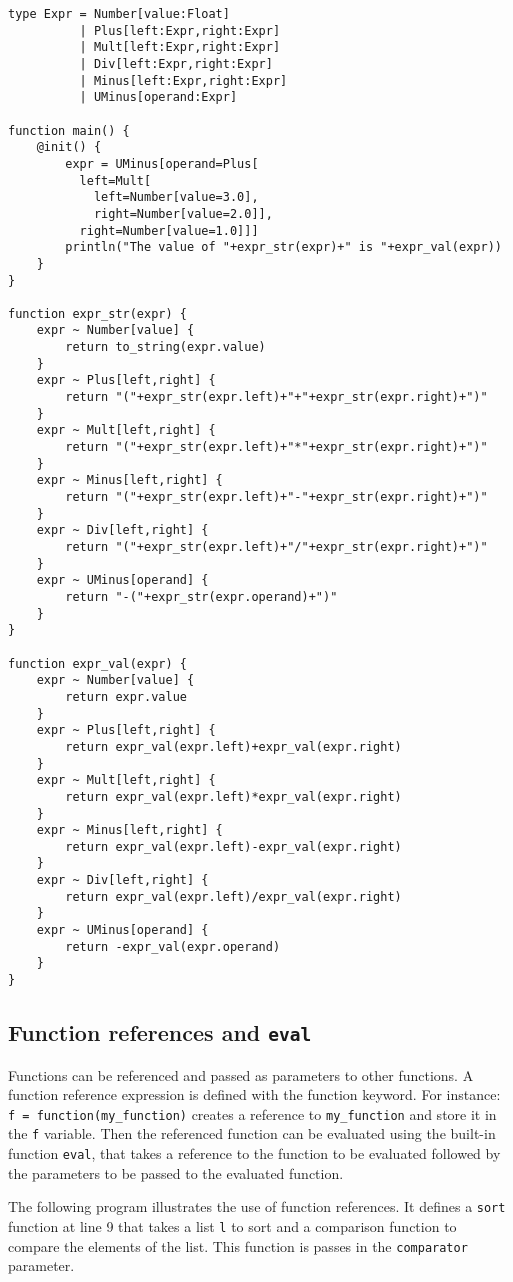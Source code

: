 \documentclass[11pt]{article}
\begin{document}
{ \footnotesize
\begin{lstlisting}
type Expr = Number[value:Float]
          | Plus[left:Expr,right:Expr]
          | Mult[left:Expr,right:Expr]
          | Div[left:Expr,right:Expr]
          | Minus[left:Expr,right:Expr]
          | UMinus[operand:Expr]

function main() {
	@init() {
		expr = UMinus[operand=Plus[
		  left=Mult[
		    left=Number[value=3.0],
		    right=Number[value=2.0]],
	      right=Number[value=1.0]]]
		println("The value of "+expr_str(expr)+" is "+expr_val(expr))
	}
}

function expr_str(expr) {
	expr ~ Number[value] {
		return to_string(expr.value)
	}
	expr ~ Plus[left,right] {
		return "("+expr_str(expr.left)+"+"+expr_str(expr.right)+")"
	}
	expr ~ Mult[left,right] {
		return "("+expr_str(expr.left)+"*"+expr_str(expr.right)+")"
	}
	expr ~ Minus[left,right] {
		return "("+expr_str(expr.left)+"-"+expr_str(expr.right)+")"
	}
	expr ~ Div[left,right] {
		return "("+expr_str(expr.left)+"/"+expr_str(expr.right)+")"
	}
	expr ~ UMinus[operand] {
		return "-("+expr_str(expr.operand)+")"
	}
}

function expr_val(expr) {
	expr ~ Number[value] {
		return expr.value
	}
	expr ~ Plus[left,right] {
		return expr_val(expr.left)+expr_val(expr.right)
	}
	expr ~ Mult[left,right] {
		return expr_val(expr.left)*expr_val(expr.right)
	}
	expr ~ Minus[left,right] {
		return expr_val(expr.left)-expr_val(expr.right)
	}
	expr ~ Div[left,right] {
		return expr_val(expr.left)/expr_val(expr.right)
	}
	expr ~ UMinus[operand] {
		return -expr_val(expr.operand)
	}
}
\end{lstlisting} }

\subsection{Function references and \texttt{eval}}

Functions can be referenced and passed as parameters to other functions. A function reference expression is defined with the function keyword. For instance: \texttt{f = function(my\_function)} creates a reference to \texttt{my\_function} and store it in the \texttt{f} variable. Then the referenced function can be evaluated using the built-in function \texttt{eval}, that takes  a reference to the function to be evaluated followed by the parameters to be passed to the evaluated function.

The following program illustrates the use of function references. It defines a \texttt{sort} function at line 9 that takes a list \texttt{l} to sort and a comparison function to compare the elements of the list. This function is passes in the \texttt{comparator} parameter.
\end{document}
